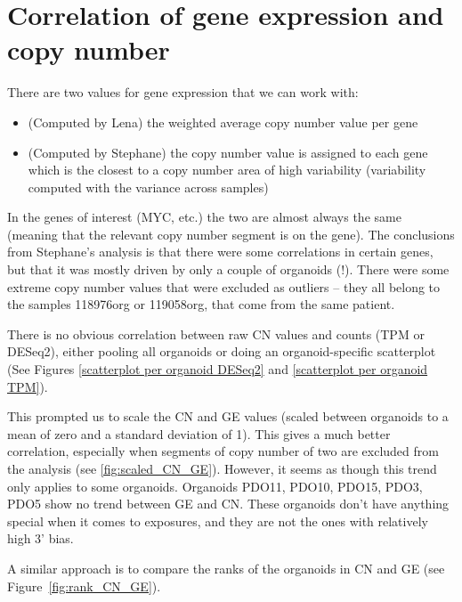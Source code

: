 \documentclass{article}
\begin{document}
\section{Correlation of gene expression and copy number}

There are two values for gene expression that we can work with:
\begin{itemize}
\item (Computed by Lena) the weighted average copy number value per gene
\item (Computed by Stephane) the copy number value is assigned to each gene which is the closest to a copy number area of high variability (variability computed with the variance across samples)
\end{itemize}

In the genes of interest (MYC, etc.) the two are almost always the same (meaning that the relevant copy number segment is on the gene). The conclusions from Stephane's analysis is that there were some correlations in certain genes, but that it was mostly driven by only a couple of organoids (!). There were some extreme copy number values that were excluded as outliers -- they all belong to the samples 118976org or 119058org, that come from the same patient.

There is no obvious correlation between raw CN values and counts (TPM or DESeq2), either pooling all organoids or doing an organoid-specific scatterplot (See Figures \href{https://github.com/lm687/Organoids_Compositional_Analysis/blob/master/RNASeq_and_CN/figures/joint_counts_CN_DESeq_all.pdf}{[scatterplot per organoid DESeq2]} and \href{https://github.com/lm687/Organoids_Compositional_Analysis/blob/master/RNASeq_and_CN/figures/joint_counts_CN_TPM_all.pdf}{[scatterplot per organoid TPM]}).

\medskip

This prompted us to scale the CN and GE values (scaled between organoids to a mean of zero and a standard deviation of 1). This gives a much better correlation, especially when segments of copy number of two are excluded from the analysis (see \ref{fig:scaled_CN_GE}). However, it seems as though this trend only applies to some organoids. Organoids PDO11, PDO10, PDO15, PDO3, PDO5 show no trend between GE and CN. These organoids don't have anything special when it comes to exposures, and they are not the ones with relatively high 3' bias.

\medskip

A similar approach is to compare the ranks of the organoids in CN and GE (see Figure~\ref{fig:rank_CN_GE}).
\end{document}
